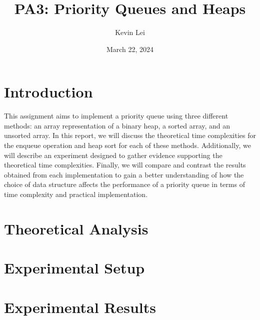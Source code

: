 \documentclass{article}
\title{PA3: Priority Queues and Heaps}
\author{Kevin Lei}
\date{March 22, 2024}
\begin{document}
\maketitle

\section{Introduction}
This assignment aims to implement a priority queue using three different methods: an array representation of a binary heap, a sorted array, and an unsorted array. 
In this report, we will discuss the theoretical time complexities for the enqueue operation and heap sort for each of these methods. 
Additionally, we will describe an experiment designed to gather evidence supporting the theoretical time complexities. 
Finally, we will compare and contrast the results obtained from each implementation to gain a better understanding of how the choice of data structure affects the performance of a priority queue in terms of time complexity and practical implementation.
\section{Theoretical Analysis}

\section{Experimental Setup}

\section{Experimental Results}
\end{document}
